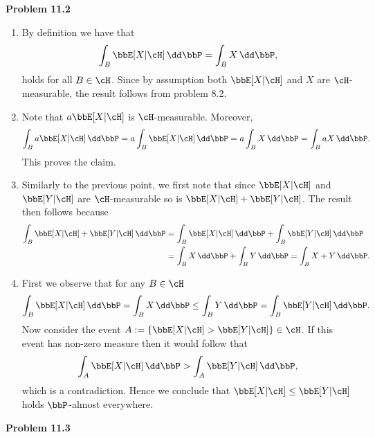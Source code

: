 



\textbf{Problem 11.2}

\begin{enumerate}[label={(\alph*)}]
\item By definition we have that
\[
	\int_B \bbE[X | \cH] \, \dd \bbP = \int_B X \, \dd \bbP,
\]
holds for all $B \in \cH$. Since by assumption both $\bbE[X | \cH]$ and $X$ are $\cH$-measurable, the result follows from problem 8.2.
\item Note that $a \bbE[X | \cH]$ is $\cH$-measurable. Moreover,
\[
	\int_B a \bbE[X | \cH] \, \dd \bbP = a \int_B \bbE[X | \cH] \, \dd \bbP = a \int_B X \, \dd \bbP = \int_B aX \, \dd \bbP.
\]
This proves the claim.
\item Similarly to the previous point, we first note that since $\bbE[X | \cH]$ and $\bbE[Y | \cH]$ are $\cH$-measurable so is $\bbE[X | \cH] + \bbE[Y | \cH]$. The result then follows because
\begin{align*}
	\int_B \bbE[X | \cH] + \bbE[Y | \cH] \, \dd \bbP 
	&= \int_B \bbE[X | \cH] \, \dd \bbP + \int_B \bbE[Y | \cH] \, \dd \bbP \\
	&= \int_B X \, \dd \bbP + \int_B Y \, \dd \bbP = \int_B X + Y \, \dd \bbP.
\end{align*}
\item First we observe that for any $B \in \cH$
\[
	\int_B \bbE[X | \cH] \, \dd \bbP = \int_B X \, \dd \bbP \le \int_B Y \, \dd \bbP = \int_B \bbE[Y | \cH] \, \dd \bbP.
\]
Now consider the event $A := \{ \bbE[X | \cH] > \bbE[Y | \cH]\} \in \cH$. If this event has non-zero measure then it would follow that
\[
	\int_A \bbE[X | \cH] \, \dd \bbP > \int_A \bbE[Y | \cH] \, \dd \bbP,
\]
which is a contradiction. Hence we conclude that $\bbE[X | \cH] \le \bbE[Y | \cH]$ holds $\bbP$-almost everywhere.
\end{enumerate}

\bigskip

\textbf{Problem 11.3}

